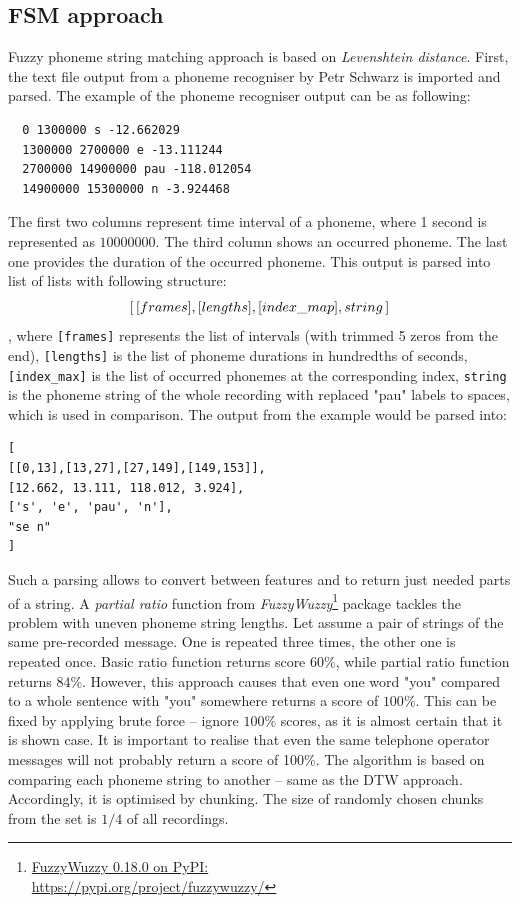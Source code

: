 \documentclass{ExcelAtFIT}
\begin{document}
\subsection{FSM approach}
Fuzzy phoneme string matching approach is based on \textit{Levenshtein distance}.
First, the text file output from a phoneme recogniser by Petr Schwarz \cite{SchwarzPhonerec} is imported and parsed. The example of the phoneme recogniser output can be as following: 
\begin{verbatim}
  0 1300000 s -12.662029
  1300000 2700000 e -13.111244
  2700000 14900000 pau -118.012054
  14900000 15300000 n -3.924468
\end{verbatim}
The first two columns represent time interval of a phoneme, where 1 second is represented as $10000000$. The third column shows an occurred phoneme. The last one provides the duration of the occurred phoneme. This output is parsed into list of lists with following structure: \texttt{\[[\,[frames],\-[lengths],\-[index\_map],\-string\,]\]}, where \texttt{[frames]} represents the list of intervals (with trimmed 5 zeros from the end), \texttt{[lengths]} is the list of phoneme durations in hundredths of seconds, \texttt{[index\_max]} is the list of occurred phonemes at the corresponding index, \texttt{string} is the phoneme string of the whole recording with replaced "pau" labels to spaces, which is used in comparison.
The output from the example would be parsed into:
\begin{verbatim}
[ 
[[0,13],[13,27],[27,149],[149,153]],
[12.662, 13.111, 118.012, 3.924],
['s', 'e', 'pau', 'n'],
"se n"
]
\end{verbatim}
Such a parsing allows to convert between features and to return just needed parts of a string.
A \textit{partial ratio} function from \textit{FuzzyWuzzy}\footnote{\href{https://pypi.org/project/fuzzywuzzy/}{FuzzyWuzzy 0.18.0 on PyPI:\\https://pypi.org/project/fuzzywuzzy/}} package tackles the problem with uneven phoneme string lengths. Let assume a pair of strings of the same pre-recorded message. One is repeated three times, the other one is repeated once. Basic ratio function returns score $60\%$, while partial ratio function returns $84\%$. However, this approach causes that even one word "you" compared to a whole sentence with "you" somewhere returns a score of $100\%$. This can be fixed by applying brute force – ignore $100\%$ scores, as it is almost certain that it is shown case. It is important to realise that even the same telephone operator messages will not probably return a score of 100\%. The algorithm is based on comparing each phoneme string to another -- same as the DTW approach. Accordingly, it is optimised by chunking. The size of randomly chosen chunks from the set is $1/4$ of all recordings. 
\end{document}

